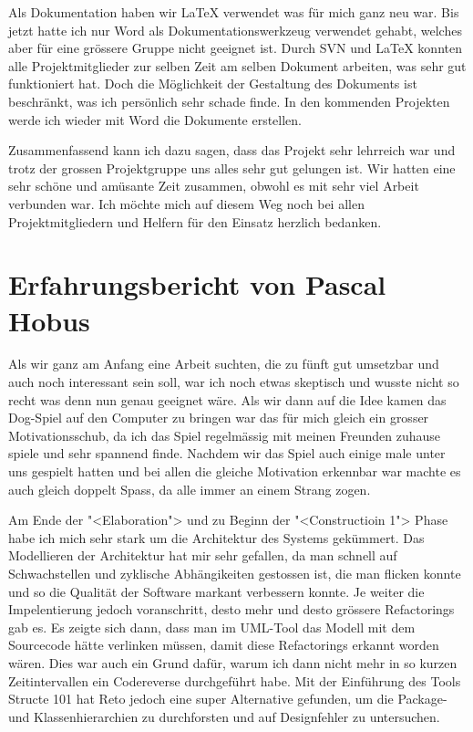 \documentclass[12pt,halfparskip]{scrartcl}
\begin{document}
Als Dokumentation haben wir LaTeX verwendet was für mich ganz neu war. Bis jetzt hatte ich nur Word als Dokumentationswerkzeug verwendet gehabt, welches aber für eine grössere Gruppe nicht geeignet ist. Durch SVN und LaTeX konnten alle Projektmitglieder zur selben Zeit am selben Dokument arbeiten, was sehr gut funktioniert hat. Doch die Möglichkeit der Gestaltung des Dokuments ist beschränkt, was ich persönlich sehr schade finde. In den kommenden Projekten werde ich wieder mit Word die Dokumente erstellen.

Zusammenfassend kann ich dazu sagen, dass das Projekt sehr lehrreich war und trotz der grossen Projektgruppe uns alles sehr gut gelungen ist. Wir hatten eine sehr schöne und amüsante Zeit zusammen, obwohl es mit sehr viel Arbeit verbunden war. Ich möchte mich auf diesem Weg noch bei allen Projektmitgliedern und Helfern für den Einsatz herzlich bedanken.


\section{Erfahrungsbericht von Pascal Hobus}

Als wir ganz am Anfang eine Arbeit suchten, die zu fünft gut umsetzbar und auch noch interessant sein soll, war ich noch etwas skeptisch und wusste nicht so recht was denn nun genau geeignet wäre. Als wir dann auf die Idee kamen das Dog-Spiel auf den Computer zu bringen war das für mich gleich ein grosser Motivationsschub, da ich das Spiel regelmässig mit meinen Freunden zuhause spiele und sehr spannend finde. Nachdem wir das Spiel auch einige male unter uns gespielt hatten und bei allen die gleiche Motivation erkennbar war machte es auch gleich doppelt Spass, da alle immer an einem Strang zogen.

Am Ende der "<Elaboration"> und zu Beginn der "<Constructioin 1"> Phase habe ich mich sehr stark um die Architektur des Systems gekümmert. Das Modellieren der Architektur hat mir sehr gefallen, da man schnell auf Schwachstellen und zyklische Abhängikeiten gestossen ist, die man flicken konnte und so die Qualität der Software markant verbessern konnte. Je weiter die Impelentierung jedoch voranschritt, desto mehr und desto grössere Refactorings gab es. Es zeigte sich dann, dass man im UML-Tool das Modell mit dem Sourcecode hätte verlinken müssen, damit diese Refactorings erkannt worden wären. Dies war auch ein Grund dafür, warum ich dann nicht mehr in so kurzen Zeitintervallen ein Codereverse durchgeführt habe. Mit der Einführung des Tools Structe 101 hat Reto jedoch eine super Alternative gefunden, um die Package- und Klassenhierarchien zu durchforsten und auf Designfehler zu untersuchen.
\end{document}
